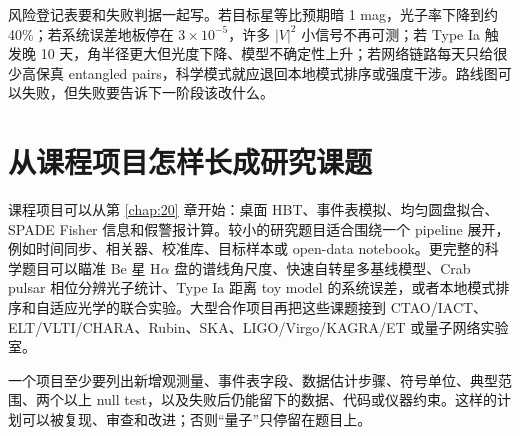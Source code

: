 风险登记表要和失败判据一起写。若目标星等比预期暗 1 mag，光子率下降到约 40\%；若系统误差地板停在 \(3\times10^{-5}\)，许多 \(|V|^2\) 小信号不再可测；若 Type Ia 触发晚 10 天，角半径更大但光度下降、模型不确定性上升；若网络链路每天只给很少高保真 entangled pairs，科学模式就应退回本地模式排序或强度干涉。路线图可以失败，但失败要告诉下一阶段该改什么。

\section{从课程项目怎样长成研究课题}

课程项目可以从第 \ref{chap:20} 章开始：桌面 HBT、事件表模拟、均匀圆盘拟合、SPADE Fisher 信息和假警报计算。较小的研究题目适合围绕一个 pipeline 展开，例如时间同步、相关器、校准库、目标样本或 open-data notebook。更完整的科学题目可以瞄准 Be 星 H\(\alpha\) 盘的谱线角尺度、快速自转星多基线模型、Crab pulsar 相位分辨光子统计、Type Ia 距离 toy model 的系统误差，或者本地模式排序和自适应光学的联合实验。大型合作项目再把这些课题接到 CTAO/IACT、ELT/VLTI/CHARA、Rubin、SKA、LIGO/Virgo/KAGRA/ET 或量子网络实验室。

一个项目至少要列出新增观测量、事件表字段、数据估计步骤、符号单位、典型范围、两个以上 null test，以及失败后仍能留下的数据、代码或仪器约束。这样的计划可以被复现、审查和改进；否则“量子”只停留在题目上。

